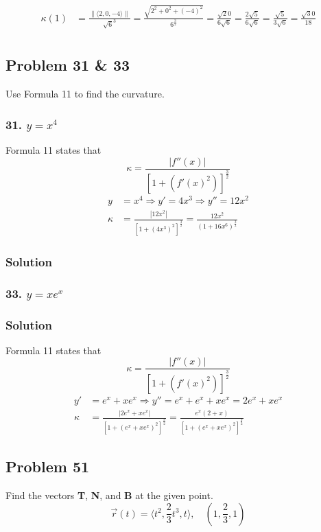 \documentclass{article}
\newcommand{\rvec}{\vec{r}(t)}
\begin{document}
\begin{align*}
    \kappa(1) &= \frac{\| \langle 2, 0, -4 \rangle \|}{\sqrt 6^3} = \frac{\sqrt{2^2 + 0^2 + (-4)^2}}{6^{\frac 3 2}} = \frac{\sqrt 20}{6\sqrt 6} = \frac{2\sqrt 5}{6\sqrt 6} = \frac{\sqrt 5}{3\sqrt 6} = \frac{\sqrt 30}{18} \\
\end{align*}


\subsection*{Problem 31 \& 33}

Use Formula 11 to find the curvature.

\subsubsection*{31. $y = x^4$}
Formula 11 states that 
\[
    \kappa = \frac{|f''(x)|}{[1 + (f'(x)^2)]^{\frac 3 2}}
\]
\begin{align*}
    y &= x^4 \Rightarrow y' = 4x^3 \Rightarrow y'' = 12x^2 \\
    \kappa &= \frac{|12x^2|}{[1+(4x^3)^2]^{\frac 3 2}} = \frac{12x^2}{(1+16x^6)^{\frac{3}{2}}}
\end{align*}
\subsubsection*{Solution}
    
\subsubsection*{33. $y = xe^x$}
\subsubsection*{Solution}
Formula 11 states that 
\[
    \kappa = \frac{|f''(x)|}{[1 + (f'(x)^2)]^{\frac 3 2}}
\]
\begin{align*}
    y' &= e^x + xe^x \Rightarrow y'' = e^x + e^x + xe^x = 2e^x + xe^x \\
    \kappa &= \frac {|2e^x + xe^x|} {[1+ (e^x + xe^x)^2]^{\frac 3 2}} = \frac {e^x(2 + x)} {[1+ (e^x + xe^x)^2]^{\frac 3 2}}
\end{align*}
\subsection*{Problem 51}
Find the vectors \textbf{T}, \textbf{N}, and \textbf{B} at the given point.
\[
    \rvec = \langle{t^2, \frac{2}{3}t^3, t}\rangle, \quad (1, \frac{2}{3}, 1)
\]
\end{document}
